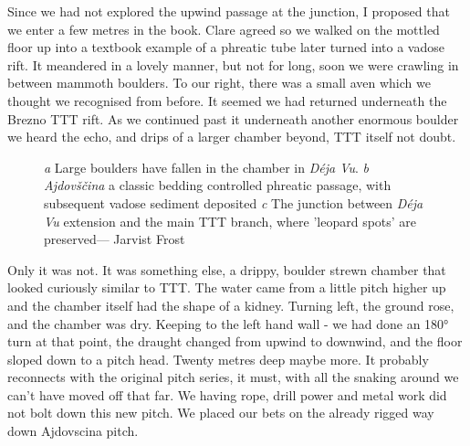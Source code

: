 Since we had not explored the upwind passage at the junction, I proposed that we enter a few metres in the book. Clare agreed so we walked on the mottled floor up into a textbook example of a phreatic tube later turned into a vadose rift. It meandered in a lovely manner, but not for long, soon we were crawling in between mammoth boulders. To our right, there was a small aven which we thought we recognised from before. It seemed we had returned underneath the Brezno TTT rift. As we continued past it underneath another enormous boulder we heard the echo, and drips of a larger chamber beyond, TTT itself not doubt.


\begin{figure}[t!]
\checkoddpage \ifoddpage \forcerectofloat \else \forceversofloat \fi
\centering
    \begin{subfigure}[t]{0.353\textwidth}
        \centering
        
        \caption{} \label{Traverse over buckwheat}
    \end{subfigure}
        \hfill
\begin{subfigure}[t]{0.63\textwidth}
\centering
{}
 \caption{}\label{passage in Deja VU}
\end{subfigure}
    \vspace{0cm}
    \begin{subfigure}[t]{\textwidth}
    \centering
       
        \caption{} \label{Dejavu}
    \end{subfigure}
    \caption{
    \emph{a} Large boulders have fallen in the chamber in \emph{Déja Vu}.  
     \emph{b} \emph{Ajdovščina} a classic bedding controlled phreatic passage, with subsequent vadose sediment deposited
     \emph{c} The junction between  \emph{Déja Vu} extension and the main TTT branch, where 'leopard spots' are preserved--- Jarvist Frost }
\end{figure}


Only it was not. It was something else, a drippy, boulder strewn chamber that looked curiously similar to TTT. The water came from a little pitch higher up and the chamber itself had the shape of a kidney. Turning left, the ground rose, and the chamber was dry. Keeping to the left hand wall - we had done an 180° turn at that point, the draught changed from upwind to downwind, and the floor sloped down to a pitch head. Twenty metres deep maybe more. It probably reconnects with the original pitch series, it must, with all the snaking around we can’t have moved off that far. We having rope, drill power and metal work did not bolt down this new pitch. We placed our bets on the already rigged way down Ajdovscina pitch. 

